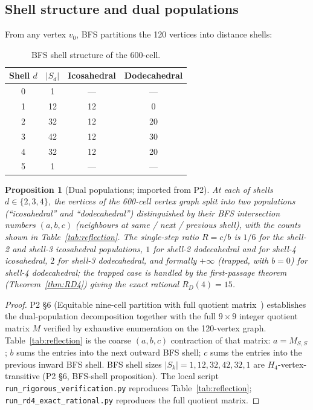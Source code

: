 \documentclass[12pt]{article}
\newtheorem{proposition}[theorem]{Proposition}
\begin{document}
\subsection{Shell structure and dual populations}

From any vertex $v_0$, BFS partitions the 120 vertices into distance shells:

\begin{table}[ht]
\centering
\caption{BFS shell structure of the 600-cell.}
\label{tab:shells}
\begin{tabular}{@{}cccc@{}}
\toprule
Shell $d$ & $|S_d|$ & Icosahedral & Dodecahedral \\
\midrule
0 & 1 & --- & --- \\
1 & 12 & 12 & 0 \\
2 & 32 & 12 & 20 \\
3 & 42 & 12 & 30 \\
4 & 32 & 12 & 20 \\
5 & 1 & --- & --- \\
\bottomrule
\end{tabular}
\end{table}

\begin{proposition}[Dual populations; imported from P2]\label{thm:dual}
At each of shells $d \in \{2, 3, 4\}$, the vertices of the 600-cell vertex graph split into two populations (``icosahedral'' and ``dodecahedral'') distinguished by their BFS intersection numbers $(a, b, c)$ (neighbours at same / next / previous shell), with the counts shown in Table~\ref{tab:reflection}. The single-step ratio $R = c/b$ is $1/6$ for the shell-2 and shell-3 icosahedral populations, $1$ for shell-2 dodecahedral and for shell-4 icosahedral, $2$ for shell-3 dodecahedral, and formally $+\infty$ (trapped, with $b = 0$) for shell-4 dodecahedral; the trapped case is handled by the first-passage theorem (Theorem~\ref{thm:RD4}) giving the exact rational $R_D(4) = 15$.
\end{proposition}

\begin{proof}
P2 \S 6 (Equitable nine-cell partition with full quotient matrix~\citep{CascadeAlgSubstrate}) establishes the dual-population decomposition together with the full $9 \times 9$ integer quotient matrix $M$ verified by exhaustive enumeration on the 120-vertex graph. Table~\ref{tab:reflection} is the coarse $(a, b, c)$ contraction of that matrix: $a = M_{S, S}$; $b$ sums the entries into the next outward BFS shell; $c$ sums the entries into the previous inward BFS shell. BFS shell sizes $|S_k| = 1, 12, 32, 42, 32, 1$ are $H_4$-vertex-transitive (P2 \S 6, BFS-shell proposition). The local script \texttt{run\_rigorous\_verification.py} reproduces Table~\ref{tab:reflection}; \texttt{run\_rd4\_exact\_rational.py} reproduces the full quotient matrix.
\end{proof}
\end{document}

